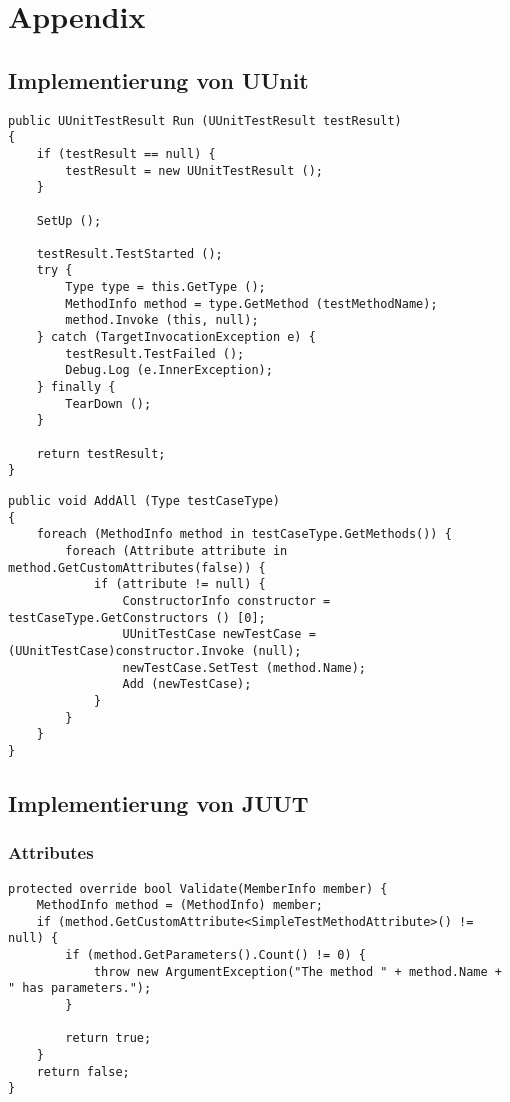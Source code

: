 \chapter{Appendix}

\section{Implementierung von UUnit}

\begin{lstlisting}[caption={[Quellcode der \textit{Run}-Methode von \textit{UUnitTestCase}]Quellcode der \textit{Run}-Methode von \textit{UUnitTestCase}}, label=code:UUnitTestCase_Run]
public UUnitTestResult Run (UUnitTestResult testResult)
{
	if (testResult == null) {
		testResult = new UUnitTestResult ();
	}
	
	SetUp ();
	
	testResult.TestStarted ();
	try {
		Type type = this.GetType ();
		MethodInfo method = type.GetMethod (testMethodName);
		method.Invoke (this, null);
	} catch (TargetInvocationException e) {
		testResult.TestFailed ();
		Debug.Log (e.InnerException);
	} finally {
		TearDown ();
	}
	
	return testResult;
}
\end{lstlisting}
\clearpage

\begin{lstlisting}[caption={[Quellcode der \textit{AddAll}-Methode von \textit{UUnitTestSuite}]Quellcode der \textit{AddAll}-Methode von \textit{UUnitTestSuite}}, label=code:UUnitTestSuite_AddAll]
public void AddAll (Type testCaseType)
{
	foreach (MethodInfo method in testCaseType.GetMethods()) {
		foreach (Attribute attribute in method.GetCustomAttributes(false)) {
			if (attribute != null) {
				ConstructorInfo constructor = testCaseType.GetConstructors () [0];
				UUnitTestCase newTestCase = (UUnitTestCase)constructor.Invoke (null);
				newTestCase.SetTest (method.Name);
				Add (newTestCase);
			}
		}
	}
}
\end{lstlisting}
\clearpage

\section{Implementierung von JUUT}

\subsection{Attributes}

\begin{lstlisting}[caption={[Quellcode der \textit{Validate}-Methode von \textit{SimpleTestMethodAttribute}]Quellcode der \textit{Validate}-Methode von \textit{SimpleTestMethodAttribute}}, label=code:SimpleTestMethodAttribute_Validate]
protected override bool Validate(MemberInfo member) {
    MethodInfo method = (MethodInfo) member;
    if (method.GetCustomAttribute<SimpleTestMethodAttribute>() != null) {
        if (method.GetParameters().Count() != 0) {
            throw new ArgumentException("The method " + method.Name + " has parameters.");
        }

        return true;
    }
    return false;
}
\end{lstlisting}
\clearpage

